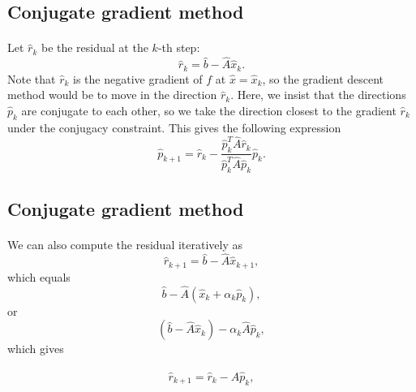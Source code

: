 \documentclass[%
oneside,                 %
final,                   %
10pt]{article}
\begin{document}
\subsection*{Conjugate gradient method}

\paragraph{}
Let  $\hat{r}_k$ be the residual at the $k$-th step:
\begin{equation*}
\hat{r}_k=\hat{b}-\hat{A}\hat{x}_k.
\end{equation*}
Note that $\hat{r}_k$ is the negative gradient of $f$ at 
$\hat{x}=\hat{x}_k$, 
so the gradient descent method would be to move in the direction $\hat{r}_k$. 
Here, we insist that the directions $\hat{p}_k$ are conjugate to each other, 
so we take the direction closest to the gradient $\hat{r}_k$  
under the conjugacy constraint. 
This gives the following expression
\begin{equation*}
\hat{p}_{k+1}=\hat{r}_k-\frac{\hat{p}_k^T \hat{A}\hat{r}_k}{\hat{p}_k^T\hat{A}\hat{p}_k} \hat{p}_k.
\end{equation*}



\subsection*{Conjugate gradient method}

\paragraph{}
We can also  compute the residual iteratively as
\begin{equation*}
\hat{r}_{k+1}=\hat{b}-\hat{A}\hat{x}_{k+1},
 \end{equation*}
which equals
\begin{equation*}
\hat{b}-\hat{A}(\hat{x}_k+\alpha_k\hat{p}_k),
 \end{equation*}
or
\begin{equation*}
(\hat{b}-\hat{A}\hat{x}_k)-\alpha_k\hat{A}\hat{p}_k,
 \end{equation*}
which gives

\begin{equation*}
\hat{r}_{k+1}=\hat{r}_k-\hat{A}\hat{p}_{k},
 \end{equation*}
\end{document}
